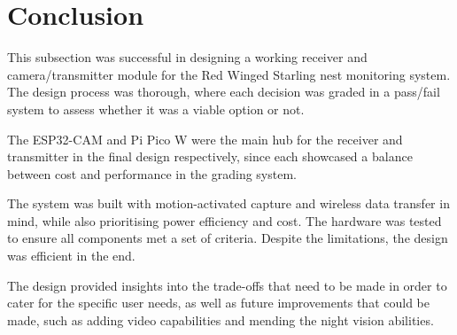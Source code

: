 \documentclass[class=report,11pt,crop=false]{standalone}
\begin{document}
\section{Conclusion}
This subsection was successful in designing a working receiver and camera/transmitter module for the Red Winged Starling nest monitoring system. The design process was thorough, where each decision was graded in 
a pass/fail system to assess whether it was a viable option or not. 

The ESP32-CAM and Pi Pico W were the main hub for the receiver and transmitter in the final design respectively, since each showcased a balance between cost and performance in the grading system. 

The system was built with motion-activated capture and wireless data transfer in mind, while also prioritising power efficiency and cost. The hardware was tested to ensure all components met a set of criteria. Despite the limitations, the design was efficient in the end. 

The design provided insights into the trade-offs that need to be made in order to cater for the specific user needs, as well as future improvements that could be made, such as adding video capabilities and mending the night vision abilities. 

\ifstandalone

\printnoidxglossary[type=\acronymtype,nonumberlist]
\fi
\end{document}
